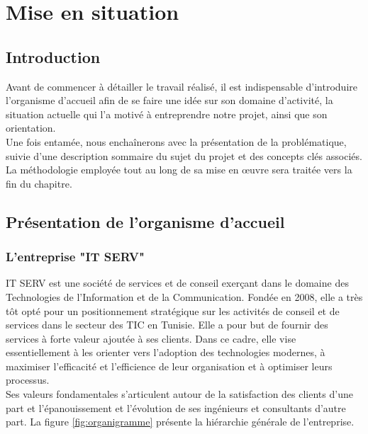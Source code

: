 
\setcounter{mtc}{2} %
\chapter{Mise en situation}
\minitoc  %

\graphicspath{{Chapitre1/figures/}}
\pagestyle{fancy}
\fancyhf{}
\fancyhead[R]{\bfseries\rightmark}
\fancyfoot[R]{\thepage}
\renewcommand{\headrulewidth}{0.5pt}
\renewcommand{\footrulewidth}{0pt}
\renewcommand{\chaptermark}[1]{\markboth{\MakeUppercase{\chaptername~\thechapter. #1 }}{}}
\renewcommand{\sectionmark}[1]{\markright{\thechapter.\thesection~ #1}}

\begin{spacing}{1.5}

\section*{Introduction}
Avant de commencer à détailler le travail réalisé, il est indispensable d'introduire l'organisme d'accueil afin de se faire une idée sur son domaine d'activité, la situation actuelle qui l'a motivé à entreprendre notre projet, ainsi que son orientation.\\
Une fois entamée, nous enchaînerons avec la présentation de la problématique, suivie d'une description sommaire du sujet du projet et des concepts clés associés.\\
La méthodologie employée tout au long de sa mise en œuvre sera traitée vers la fin du chapitre.


\section{Présentation de l'organisme d'accueil}

\subsection{L'entreprise "IT SERV"}
IT SERV est une société de services et de conseil exerçant dans le domaine des Technologies de l'Information et de la Communication.
Fondée en 2008, elle a très tôt opté pour un positionnement stratégique sur les activités de conseil et de services dans le secteur des TIC en Tunisie. Elle a pour but de fournir des services à forte valeur ajoutée à ses clients. Dans ce cadre, elle vise essentiellement à les orienter vers l'adoption des technologies modernes, à maximiser l'efficacité et l'efficience de leur organisation et à optimiser leurs processus.\\
Ses valeurs fondamentales s'articulent autour de la satisfaction des clients d'une part et l'épanouissement et l'évolution de ses ingénieurs et consultants d'autre part. La figure \ref{fig:organigramme} présente la hiérarchie générale de l'entreprise.\\


\end{spacing}

